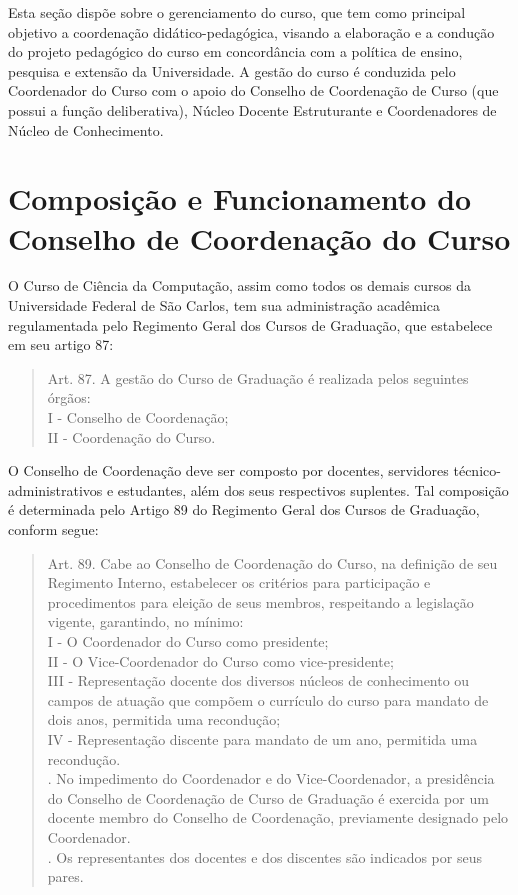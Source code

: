 
Esta seção dispõe sobre o gerenciamento do curso, que tem como principal objetivo a coordenação didático-pedagógica, visando a elaboração e a condução do projeto pedagógico do curso em concordância com a política de ensino, pesquisa e extensão da Universidade. A gestão do curso é conduzida pelo Coordenador do Curso com o apoio do Conselho de Coordenação de Curso (que possui a função deliberativa), Núcleo Docente Estruturante e Coordenadores de Núcleo de Conhecimento. 


\section{Composição e Funcionamento do Conselho de Coordenação do Curso}

O Curso de Ciência da Computação, assim como todos os demais cursos da Universidade Federal de São Carlos, tem sua administração acadêmica regulamentada pelo Regimento Geral dos Cursos de Graduação, que estabelece em seu artigo 87:

\begin{quote}
Art. 87. A gestão do Curso de Graduação é realizada pelos seguintes órgãos:\\
I - Conselho de Coordenação;\\
II - Coordenação do Curso.
\end{quote}

O Conselho de Coordenação deve ser composto por docentes, servidores técnico-administrativos e estudantes, além dos seus respectivos suplentes. Tal composição é determinada pelo Artigo 89 do Regimento Geral dos Cursos de Graduação, conform segue:

\begin{quote}
Art. 89. Cabe ao Conselho de Coordenação do Curso, na definição de seu Regimento Interno, estabelecer os critérios para participação e procedimentos para eleição de seus membros, respeitando a legislação vigente, garantindo, no mínimo:\\
I - O Coordenador do Curso como presidente;\\
II - O Vice-Coordenador do Curso como vice-presidente;\\
III - Representação docente dos diversos núcleos de conhecimento ou campos de atuação que compõem o currículo do curso para mandato de dois anos, permitida uma recondução;\\
IV - Representação discente para mandato de um ano, permitida uma recondução.\\
\textordmasculine. No impedimento do Coordenador e do Vice-Coordenador, a presidência do Conselho de Coordenação de Curso de Graduação é exercida por um docente membro do Conselho de Coordenação, previamente designado pelo Coordenador.\\
\textordmasculine. Os representantes dos docentes e dos discentes são indicados por seus pares. 
\end{quote}

